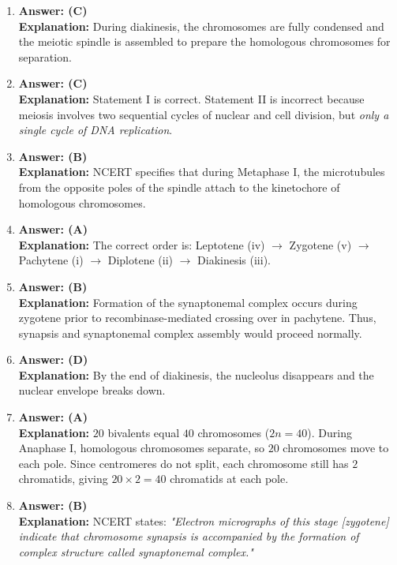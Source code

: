 \documentclass[11pt,a4paper]{article}
\begin{document}
\begin{enumerate}[label=\textbf{\arabic*.}]
\item \textbf{Answer: (C)}\\
\textbf{Explanation:} During diakinesis, the chromosomes are fully condensed and the meiotic spindle is assembled to prepare the homologous chromosomes for separation.

\item \textbf{Answer: (C)}\\
\textbf{Explanation:} Statement I is correct. Statement II is incorrect because meiosis involves two sequential cycles of nuclear and cell division, but \textit{only a single cycle of DNA replication}.

\item \textbf{Answer: (B)}\\
\textbf{Explanation:} NCERT specifies that during Metaphase I, the microtubules from the opposite poles of the spindle attach to the kinetochore of homologous chromosomes.

\item \textbf{Answer: (A)}\\
\textbf{Explanation:} The correct order is: Leptotene (iv) $\rightarrow$ Zygotene (v) $\rightarrow$ Pachytene (i) $\rightarrow$ Diplotene (ii) $\rightarrow$ Diakinesis (iii).

\item \textbf{Answer: (B)}\\
\textbf{Explanation:} Formation of the synaptonemal complex occurs during zygotene prior to recombinase-mediated crossing over in pachytene. Thus, synapsis and synaptonemal complex assembly would proceed normally.

\item \textbf{Answer: (D)}\\
\textbf{Explanation:} By the end of diakinesis, the nucleolus disappears and the nuclear envelope breaks down.

\item \textbf{Answer: (A)}\\
\textbf{Explanation:} $20$ bivalents equal $40$ chromosomes ($2n = 40$). During Anaphase I, homologous chromosomes separate, so $20$ chromosomes move to each pole. Since centromeres do not split, each chromosome still has $2$ chromatids, giving $20 \times 2 = 40$ chromatids at each pole.

\item \textbf{Answer: (B)}\\
\textbf{Explanation:} NCERT states: \textit{"Electron micrographs of this stage [zygotene] indicate that chromosome synapsis is accompanied by the formation of complex structure called synaptonemal complex."}


\end{enumerate}
\end{document}
